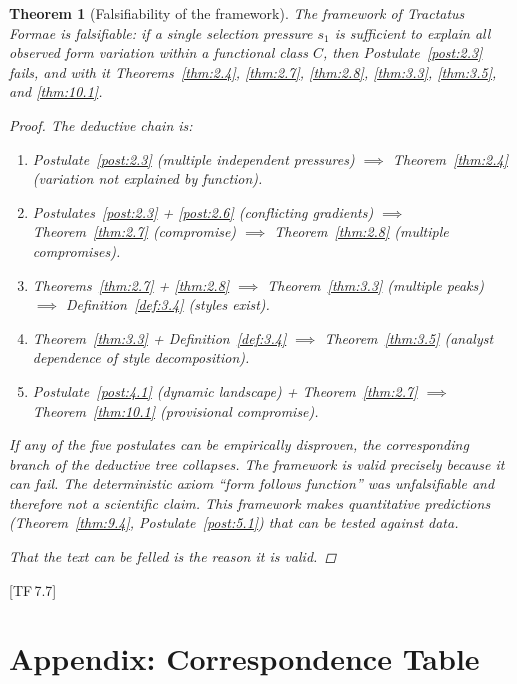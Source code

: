 \documentclass[10pt]{article}
\theoremstyle{definition}
\theoremstyle{plain}
\newtheorem{theorem}[definition]{Theorem}
\theoremstyle{remark}
\newcommand{\TF}[1]{\textnormal{[TF\,#1]}}  %
\begin{document}
\begin{theorem}[Falsifiability of the framework]\label{thm:10.3}
The framework of Tractatus Formae is falsifiable: if a single selection
pressure $s_1$ is sufficient to explain all observed form variation
within a functional class $C$, then Postulate~\ref{post:2.3} fails, and
with it Theorems~\ref{thm:2.4}, \ref{thm:2.7}, \ref{thm:2.8},
\ref{thm:3.3}, \ref{thm:3.5}, and \ref{thm:10.1}.

\begin{proof}
The deductive chain is:
\begin{enumerate}[nosep]
  \item Postulate~\ref{post:2.3} (multiple independent pressures)
    $\implies$ Theorem~\ref{thm:2.4} (variation not explained by
    function).
  \item Postulates~\ref{post:2.3} + \ref{post:2.6} (conflicting
    gradients) $\implies$ Theorem~\ref{thm:2.7} (compromise) $\implies$
    Theorem~\ref{thm:2.8} (multiple compromises).
  \item Theorems~\ref{thm:2.7} + \ref{thm:2.8} $\implies$
    Theorem~\ref{thm:3.3} (multiple peaks) $\implies$
    Definition~\ref{def:3.4} (styles exist).
  \item Theorem~\ref{thm:3.3} + Definition~\ref{def:3.4} $\implies$
    Theorem~\ref{thm:3.5} (analyst dependence of style decomposition).
  \item Postulate~\ref{post:4.1} (dynamic landscape) + Theorem~\ref{thm:2.7}
    $\implies$ Theorem~\ref{thm:10.1} (provisional compromise).
\end{enumerate}

If any of the five postulates can be empirically disproven, the
corresponding branch of the deductive tree collapses. The framework
is valid precisely because it can fail. The deterministic axiom
``form follows function'' was unfalsifiable and therefore
not a scientific claim. This framework makes quantitative predictions
(Theorem~\ref{thm:9.4}, Postulate~\ref{post:5.1}) that can be tested
against data.

That the text \emph{can} be felled is the reason it is valid.
\qedhere
\end{proof}
\end{theorem}

\TF{7.7}


\newpage
\section*{Appendix: Correspondence Table}
\end{document}

